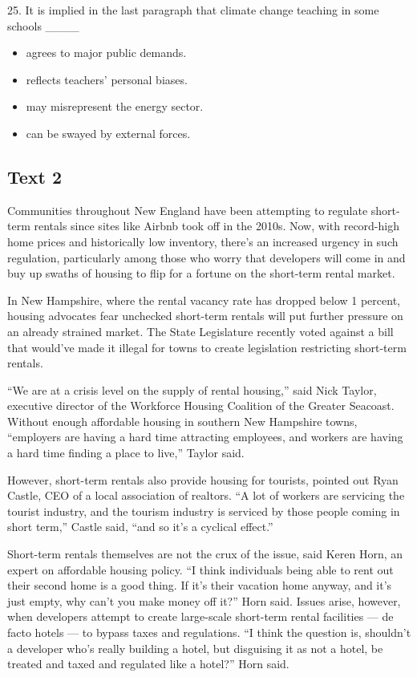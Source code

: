 \documentclass[UTF8,11pt]{ctexart}
\begin{document}
25. It is implied in the last paragraph that climate change teaching in some schools \_\_\_\_


\begin{itemize}[leftmargin=2em,itemsep=.2em,topsep=.4em]\item[A.] agrees to major public demands.
\item[B.] reflects teachers’ personal biases.
\item[C.] may misrepresent the energy sector.
\item[D.] can be swayed by external forces.
\end{itemize}

\subsection*{\textbf{Text 2}}


Communities throughout New England have been attempting to regulate short-term rentals since sites like Airbnb took off in the 2010s. Now, with record-high home prices and historically low inventory, there’s an increased urgency in such regulation, particularly among those who worry that developers will come in and buy up swaths of housing to flip for a fortune on the short-term rental market.


In New Hampshire, where the rental vacancy rate has dropped below 1 percent, housing advocates fear unchecked short-term rentals will put further pressure on an already strained market. The State Legislature recently voted against a bill that would’ve made it illegal for towns to create legislation restricting short-term rentals.


“We are at a crisis level on the supply of rental housing,” said Nick Taylor, executive director of the Workforce Housing Coalition of the Greater Seacoast. Without enough affordable housing in southern New Hampshire towns, “employers are having a hard time attracting employees, and workers are having a hard time finding a place to live,” Taylor said.


However, short-term rentals also provide housing for tourists, pointed out Ryan Castle, CEO of a local association of realtors. “A lot of workers are servicing the tourist industry, and the tourism industry is serviced by those people coming in short term,” Castle said, “and so it’s a cyclical effect.”


Short-term rentals themselves are not the crux of the issue, said Keren Horn, an expert on affordable housing policy. “I think individuals being able to rent out their second home is a good thing. If it’s their vacation home anyway, and it’s just empty, why can’t you make money off it?” Horn said. Issues arise, however, when developers attempt to create large-scale short-term rental facilities — de facto hotels — to bypass taxes and regulations. “I think the question is, shouldn’t a developer who’s really building a hotel, but disguising it as not a hotel, be treated and taxed and regulated like a hotel?” Horn said.
\end{document}

